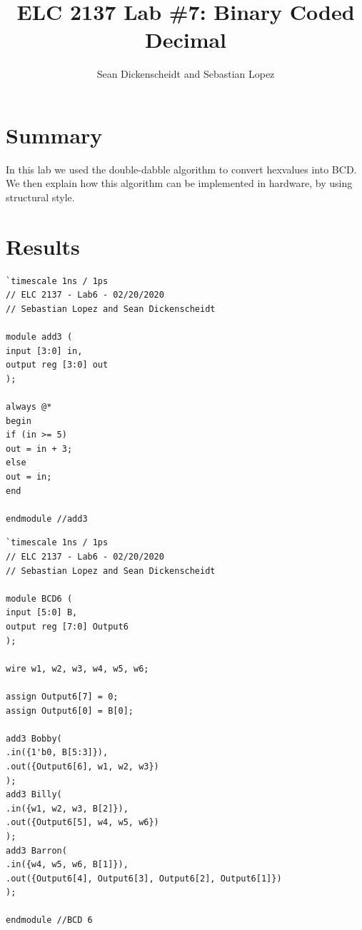 \documentclass[11pt]{article}
\begin{document}
\title{ELC 2137 Lab \#7: Binary Coded Decimal}
\author{Sean Dickenscheidt and Sebastian Lopez}

\maketitle


\section*{Summary}

In this lab we used the double-dabble algorithm to convert hexvalues into BCD. We then explain how this algorithm can be implemented in hardware, by using structural style.

\section*{Results}


\begin{lstlisting}[style=Verilog,
caption=Add3 code,
label=code:ex 
]
`timescale 1ns / 1ps
// ELC 2137 - Lab6 - 02/20/2020
// Sebastian Lopez and Sean Dickenscheidt 

module add3 (
input [3:0] in, 
output reg [3:0] out
);

always @* 
begin
if (in >= 5)
out = in + 3; 
else
out = in;
end  

endmodule //add3
\end{lstlisting}

\begin{lstlisting}[style=Verilog,
caption=BCD6 code,
label=code:ex 
]
`timescale 1ns / 1ps
// ELC 2137 - Lab6 - 02/20/2020
// Sebastian Lopez and Sean Dickenscheidt 

module BCD6 (
input [5:0] B, 
output reg [7:0] Output6
);

wire w1, w2, w3, w4, w5, w6;

assign Output6[7] = 0; 
assign Output6[0] = B[0];

add3 Bobby(
.in({1'b0, B[5:3]}), 
.out({Output6[6], w1, w2, w3}) 
);
add3 Billy(
.in({w1, w2, w3, B[2]}), 
.out({Output6[5], w4, w5, w6})
);
add3 Barron(
.in({w4, w5, w6, B[1]}),
.out({Output6[4], Output6[3], Output6[2], Output6[1]})
);

endmodule //BCD 6


\end{lstlisting}
\end{document}
